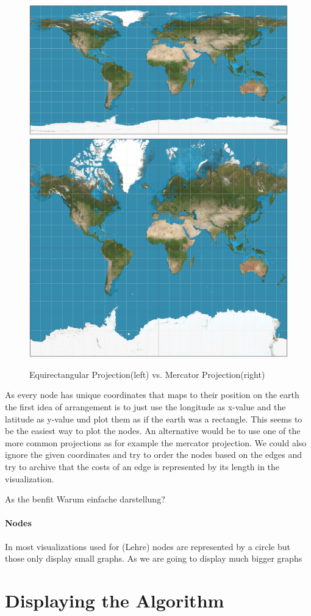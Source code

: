 \documentclass
[
	paper = a4,
    pagesize,
	12 pt,
	oneside,                       %
    open = right,
	DIV = calc,
	BCOR = 0 mm,                   %
	bibtotoc
]
{scrbook}
\begin{document}
\begin{figure}[h!]
	\includegraphics[width=.5\textwidth]{Images/Equirectangular_projection_SW.jpg}
	\includegraphics[width=.5\textwidth]{Images/Mercator_projection_SW.jpg}
\caption[]{Equirectangular Projection(left) vs. Mercator Projection(right)}
\label{fig:search_fronts_ell}
\end{figure}



As every node has unique coordinates that maps to their position on the earth the first idea of arrangement is to just use the longitude as x-value and the latitude as y-value und plot them as if the earth was a rectangle.
This seems to be the easiest way to plot the nodes.
An alternative would be to use one of the more common projections as for example the mercator projection.
We could also ignore the given coordinates and try to order the nodes based on the edges and try to archive that the costs of an edge is represented by its length in the visualization.



As the benfit
Warum einfache darstellung?

\paragraph{Nodes}
In most visualizations used for (Lehre) nodes are represented by a circle but those only display small graphs. As we are going to display much bigger graphs



\section{Displaying the Algorithm}
\end{document}
